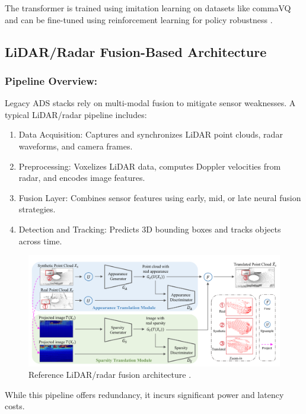 \documentclass[12pt]{article}
\begin{document}
The transformer is trained using imitation learning on datasets like commaVQ and can be fine-tuned using reinforcement learning for policy robustness \autocite{goff2025learningdriveworldmodel}.

\subsection{LiDAR/Radar Fusion-Based Architecture}

\subsubsection{Pipeline Overview:}

Legacy ADS stacks rely on multi-modal fusion to mitigate sensor weaknesses. A typical LiDAR/radar pipeline includes:

\begin{enumerate}[label=\alph*), nosep]
  \item Data Acquisition: Captures and synchronizes LiDAR point clouds, radar waveforms, and camera frames.
  \item Preprocessing: Voxelizes LiDAR data, computes Doppler velocities from radar, and encodes image features.
  \item Fusion Layer: Combines sensor features using early, mid, or late neural fusion strategies.
  \item Detection and Tracking: Predicts 3D bounding boxes and tracks objects across time.
\end{enumerate}

\begin{figure}[H]
	\centering
	\includegraphics[width=\textwidth]{lidararchitecture}
	\caption{Reference LiDAR/radar fusion architecture \autocite{Haghighi2024}.}
	\label{fig:lidarstack}
\end{figure}

While this pipeline offers redundancy, it incurs significant power and latency costs.
\end{document}

